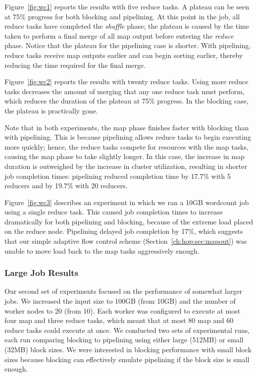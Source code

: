 Figure~\ref{fig:wc1} reports the results with five reduce tasks. A plateau can
be seen at 75\% progress for both blocking and pipelining. At this point in the
job, all reduce tasks have completed the {\em shuffle} phase; the plateau is
caused by the time taken to perform a final merge of all map output before
entering the {\em reduce} phase. Notice that the plateau for the pipelining case
is shorter. With pipelining, reduce tasks receive map outputs earlier and can
begin sorting earlier, thereby reducing the time required for the final merge.

Figure~\ref{fig:wc2} reports the results with twenty reduce tasks. Using more
reduce tasks decreases the amount of merging that any one reduce task must
perform, which reduces the duration of the plateau at 75\% progress. In the
blocking case, the plateau is practically gone.%

Note that in both experiments, the map phase finishes faster with blocking than
with pipelining. This is because pipelining allows reduce tasks to begin
executing more quickly; hence, the reduce tasks compete for resources with the
map tasks, causing the map phase to take slightly longer. In this case, the
increase in map duration is outweighed by the increase in cluster utilization,
resulting in shorter job completion times: pipelining reduced completion time by
17.7\% with 5 reducers and by 19.7\% with 20 reducers.

Figure~\ref{fig:wc3} describes an experiment in which we ran a 10GB wordcount
job using a single reduce task. This caused job completion times to increase
dramatically for both pipelining and blocking, because of the extreme load
placed on the reduce node. Pipelining delayed job completion by
\texttildelow{}17\%, which suggests that our simple adaptive flow control scheme
(Section~\ref{ch:hop:sec:mapout}) was unable to move load back to the map tasks
aggressively enough.

\subsubsection{Large Job Results}
Our second set of experiments focused on the performance of somewhat larger
jobs. We increased the input size to 100GB (from 10GB) and the number of worker
nodes to 20 (from 10). Each worker was configured to execute at most four map
and three reduce tasks, which meant that at most 80 map and 60 reduce tasks
could execute at once. We conducted two sets of experimental runs, each run
comparing blocking to pipelining using either large (512MB) or small (32MB)
block sizes. We were interested in blocking performance with small block sizes
because blocking can effectively emulate pipelining if the block size is small
enough.

